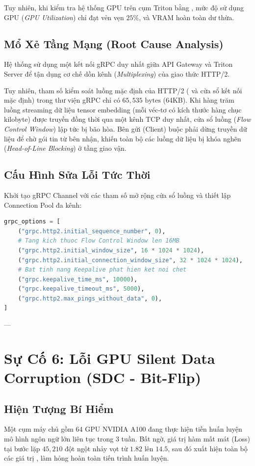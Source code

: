 Tuy nhiên, khi kiểm tra hệ thống GPU trên cụm Triton bằng , mức độ sử dụng GPU (\textit{GPU Utilization}) chỉ đạt vẻn vẹn $25\%$, và VRAM hoàn toàn dư thừa.

\subsection{Mổ Xẻ Tầng Mạng (Root Cause Analysis)}
Hệ thống sử dụng một kết nối gRPC duy nhất giữa API Gateway và Triton Server để tận dụng cơ chế dồn kênh (\textit{Multiplexing}) của giao thức HTTP/2.

Tuy nhiên, tham số kiểm soát luồng mặc định của HTTP/2 ( và cửa sổ kết nối mặc định) trong thư viện gRPC chỉ có $65,535\text{ bytes}$ (64KB). 
Khi hàng trăm luồng streaming dữ liệu tensor embedding (mỗi véc-tơ có kích thước hàng chục kilobyte) được truyền đồng thời qua một kênh TCP duy nhất, cửa sổ luồng (\textit{Flow Control Window}) lập tức bị bão hòa. Bên gửi (Client) buộc phải dừng truyền dữ liệu để chờ gói tin  từ bên nhận, khiến toàn bộ các luồng dữ liệu bị khóa nghẽn (\textit{Head-of-Line Blocking}) ở tầng giao vận.

\subsection{Cấu Hình Sửa Lỗi Tức Thời}
Khởi tạo gRPC Channel với các tham số mở rộng cửa sổ luồng và thiết lập Connection Pool đa kênh:
\begin{lstlisting}[language=python]
grpc_options = [
    ("grpc.http2.initial_sequence_number", 0),
    # Tang kich thuoc Flow Control Window len 16MB
    ("grpc.http2.initial_window_size", 16 * 1024 * 1024),
    ("grpc.http2.initial_connection_window_size", 32 * 1024 * 1024),
    # Bat tinh nang Keepalive phat hien ket noi chet
    ("grpc.keepalive_time_ms", 10000),
    ("grpc.keepalive_timeout_ms", 5000),
    ("grpc.http2.max_pings_without_data", 0),
]
\end{lstlisting}

---

\section{Sự Cố 6: Lỗi GPU Silent Data Corruption (SDC - Bit-Flip)}
\label{sec:postmortem-gpu-sdc}

\subsection{Hiện Tượng Bí Hiểm}
Một cụm máy chủ gồm 64 GPU NVIDIA A100 đang thực hiện tiền huấn luyện mô hình ngôn ngữ lớn liên tục trong 3 tuần. Bất ngờ, giá trị hàm mất mát (Loss) tại bước lặp $45,210$ đột ngột nhảy vọt từ $1.82$ lên $14.5$, sau đó xuất hiện toàn bộ các giá trị , làm hỏng hoàn toàn tiến trình huấn luyện.

